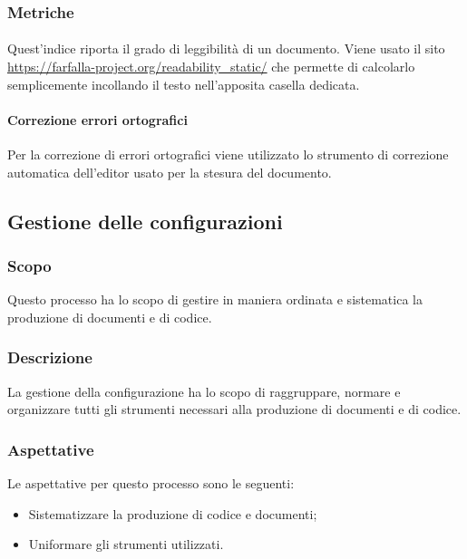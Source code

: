\documentclass[../norme_di_progetto.tex]{subfiles}
\begin{document}
\subsubsection{Metriche}

\paragraph{}
Quest'indice riporta il grado di leggibilità di un documento. Viene usato il sito \url{https://farfalla-project.org/readability_static/} che permette di calcolarlo semplicemente incollando il testo nell'apposita casella dedicata.

\paragraph{Correzione errori ortografici}
Per la correzione di errori ortografici viene utilizzato lo strumento di correzione automatica dell'editor usato per la stesura del documento.

\subsection{Gestione delle configurazioni}

\subsubsection{Scopo}
Questo processo ha lo scopo di gestire in maniera ordinata e sistematica la produzione di documenti e di codice.

\subsubsection{Descrizione}
La gestione della configurazione ha lo scopo di raggruppare, normare e organizzare tutti gli strumenti necessari alla produzione di documenti e di codice.

\subsubsection{Aspettative}
Le aspettative per questo processo sono le seguenti:
\begin{itemize}
    \item Sistematizzare la produzione di codice e documenti;
    \item Uniformare gli strumenti utilizzati.
\end{itemize}
\end{document}
